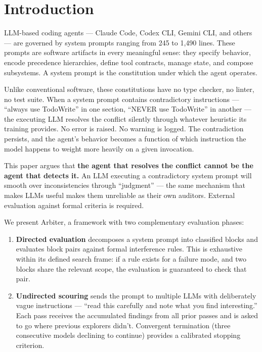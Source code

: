 \section{Introduction}

LLM-based coding agents --- Claude Code, Codex CLI, Gemini CLI, and
others --- are governed by system prompts ranging from 245 to 1,490
lines. These prompts are software artifacts in every meaningful sense:
they specify behavior, encode precedence hierarchies, define tool
contracts, manage state, and compose subsystems. A system prompt is the
constitution under which the agent operates.

Unlike conventional software, these constitutions have no type checker,
no linter, no test suite. When a system prompt contains contradictory
instructions --- ``always use TodoWrite'' in one section, ``NEVER use
TodoWrite'' in another --- the executing LLM resolves the conflict
silently through whatever heuristic its training provides. No error is
raised. No warning is logged. The contradiction persists, and the
agent's behavior becomes a function of which instruction the model
happens to weight more heavily on a given invocation.

This paper argues that \textbf{the agent that resolves the conflict
cannot be the agent that detects it.} An LLM executing a contradictory
system prompt will smooth over inconsistencies through ``judgment'' ---
the same mechanism that makes LLMs useful makes them unreliable as their
own auditors. External evaluation against formal criteria is required.

We present Arbiter, a framework with two complementary evaluation
phases:

\begin{enumerate}
\def\labelenumi{\arabic{enumi}.}
\item
  \textbf{Directed evaluation} decomposes a system prompt into
  classified blocks and evaluates block pairs against formal
  interference rules. This is exhaustive within its defined search
  frame: if a rule exists for a failure mode, and two blocks share the
  relevant scope, the evaluation is guaranteed to check that pair.
\item
  \textbf{Undirected scouring} sends the prompt to multiple LLMs with
  deliberately vague instructions --- ``read this carefully and note
  what you find interesting.'' Each pass receives the accumulated
  findings from all prior passes and is asked to go where previous
  explorers didn't. Convergent termination (three consecutive models
  declining to continue) provides a calibrated stopping criterion.
\end{enumerate}

